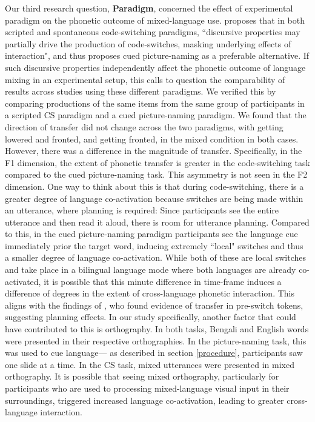 \documentclass[12 pt]{article}
\newcommand{\nt}[1]{\textipa{[#1]}} %
\begin{document}
Our third research question, \textbf{Paradigm}, concerned the effect of experimental paradigm on the phonetic outcome of mixed-language use. \cite{olson2013bilingual} proposes that in both scripted and spontaneous code-switching paradigms, ``discursive properties may partially drive the production of code-switches, masking underlying effects of interaction", and thus proposes cued picture-naming as a preferable alternative. If such discursive properties independently affect the phonetic outcome of language mixing in an experimental setup, this calls to question the comparability of results across studies using these different paradigms. We verified this by comparing productions of the same items from the same group of participants in a scripted CS paradigm and a cued picture-naming paradigm. We found that the direction of transfer did not change across the two paradigms, with \nt{2} getting lowered and fronted, and \nt{\ae} getting fronted, in the mixed condition in both cases. However, there was a difference in the magnitude of transfer. Specifically, in the F1 dimension, the extent of phonetic transfer is greater in the code-switching task compared to the cued picture-naming task. This asymmetry is not seen in the F2 dimension.
One way to think about this is that during code-switching, there is a greater degree of language co-activation because switches are being made within an utterance, where planning is required: Since participants see the entire utterance and then read it aloud, there is room for utterance planning. Compared to this, in the cued picture-naming paradigm participants see the language cue immediately prior the target word, inducing extremely ``local" switches and thus a smaller degree of language co-activation. While both of these are local switches and take place in a bilingual language mode where both languages are already co-activated, it is possible that this minute difference in time-frame induces a difference of degrees in the extent of cross-language phonetic interaction. This aligns with the findings of \cite{bullock2009trying}, who found evidence of transfer in pre-switch tokens, suggesting planning effects. In our study specifically, another factor that could have contributed to this is orthography. In both tasks, Bengali and English words were presented in their respective orthographies. In the picture-naming task, this was used to cue language--- as described in  section \ref{procedure}, participants saw one slide at a time. In the CS task, mixed utterances were presented in mixed orthography. It is possible that seeing mixed orthography, particularly for participants who are used to processing mixed-language visual input in their surroundings, triggered increased language co-activation, leading to greater cross-language interaction.
\end{document}
